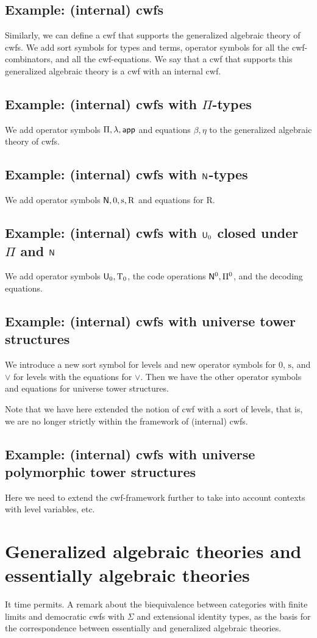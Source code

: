 \documentclass{lmcs}
\newcommand{\s}{\mathrm{s}}
\newcommand{\Rec}{\mathrm{R}}
\newcommand{\Ta}{\mathrm{T}}
\begin{document}
\subsection{Example: (internal) cwfs} Similarly, we can define a cwf that supports the generalized algebraic theory of cwfs. We add sort symbols for types and terms, operator symbols for all the cwf-combinators, and all the cwf-equations. We say that a cwf that supports this generalized algebraic theory is a cwf with an internal cwf.

\subsection{Example: (internal) cwfs with $\Pi$-types} 
We add operator symbols $\Pi, \lambda, \mathsf{app}$ and equations $\beta, \eta$ to the generalized algebraic theory of cwfs. 

\subsection{Example: (internal) cwfs with $\mathsf{N}$-types} 
We add operator symbols $\N, 0, \s, \Rec$ and equations for $\Rec$.

\subsection{Example: (internal) cwfs with $\mathsf{U}_0$ closed under $\Pi$ and $\mathsf{N}$} 
We add operator symbols $\U_0, \Ta_0$, the code operations $\mathsf{N}^0, \Pi^0$, and the decoding equations.

\subsection{Example: (internal) cwfs with universe tower structures} We introduce a new sort symbol for levels and new operator symbols for 0, $\s$, and $\vee$ for levels with the equations for $\vee$. Then we have the other operator symbols and equations for universe tower structures.

Note that we have here extended the notion of cwf with a sort of levels, that is, we are no longer strictly within the framework of (internal) cwfs.

\subsection{Example: (internal) cwfs with universe polymorphic tower structures} Here we need to extend the cwf-framework further to take into account contexts with level variables, etc.

\section{Generalized algebraic theories and essentially algebraic theories}

It time permits. A remark about the biequivalence between categories with finite limits and democratic cwfs with $\Sigma$ and extensional identity types, as the basis for the correspondence between essentially and generalized algebraic theories.
\end{document}
